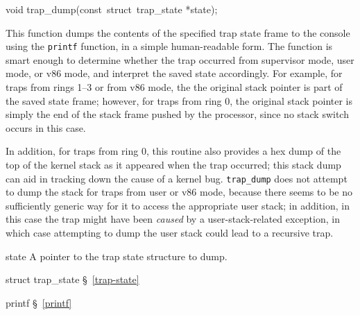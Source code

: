 \label{trap-dump}
\begin{apisyn}

	\funcproto void trap_dump(const~struct~trap_state *state);
\end{apisyn}
\begin{apidesc}
	This function dumps the contents of the specified trap state frame
	to the console using the {\tt printf} function,
	in a simple human-readable form.
	The function is smart enough to determine
	whether the trap occurred from supervisor mode, user mode, or v86 mode,
	and interpret the saved state accordingly.
	For example, for traps from rings 1--3 or from v86 mode,
	the the original stack pointer is part of the saved state frame;
	however, for traps from ring 0,
	the original stack pointer is simply
	the end of the stack frame pushed by the processor,
	since no stack switch occurs in this case.

	In addition, for traps from ring 0,
	this routine also provides a hex dump of the top of the kernel stack
	as it appeared when the trap occurred;
	this stack dump can aid in tracking down the cause of a kernel bug.
	{\tt trap_dump} does not attempt to dump the stack
	for traps from user or v86 mode,
	because there seems to be no sufficiently generic way
	for it to access the appropriate user stack;
	in addition, in this case the trap might have been \emph{caused}
	by a user-stack-related exception,
	in which case attempting to dump the user stack
	could lead to a recursive trap.
\end{apidesc}
\begin{apiparm}
	\item[state]
		A pointer to the trap state structure to dump.
\end{apiparm}
\begin{apidep}
	\item[struct trap_state]	\S~\ref{trap-state}
	\item[printf]			\S~\ref{printf}
\end{apidep}

